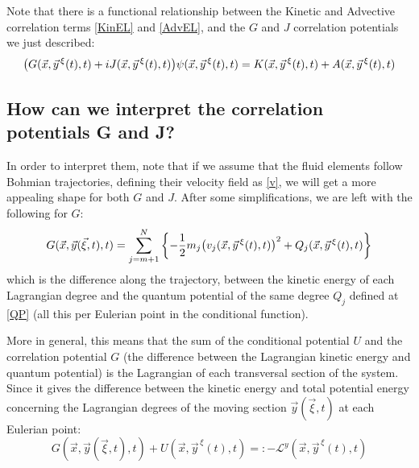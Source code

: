 \documentclass[11pt, a4paper]{article} %
\newcommand{\Lg}{\mathscr{L}}
\begin{document}
Note that there is a functional relationship between the Kinetic and Advective correlation terms \eqref{KinEL} and \eqref{AdvEL}, and the $G$ and $J$ correlation potentials we just described: 
\begin{equation}
\qty(G(\vec{x}, \vec{y}^{\, \xi}(t),t)+iJ(\vec{x}, \vec{y}^{\, \xi}(t),t))\psi(\vec{x}, \vec{y}^{\, \xi}(t),t)=K(\vec{x}, \vec{y}^{\, \xi}(t),t)+A(\vec{x}, \vec{y}^{\, \xi}(t),t)\vspace{-0.2cm}
\end{equation}
\subsection*{How can we interpret the correlation potentials G and J?}
In order to interpret them, note that if we assume that the fluid elements follow Bohmian trajectories, defining their velocity field as \eqref{v}, we will get a more appealing shape for both $G$ and $J$. After some simplifications, we are left with the following for $G$:
\begin{equation}\label{G.Bohm}
G(\vec{x},\vec{y}(\vec{\xi},t),t)=\sum_{j=m+1}^N\qty{-\frac{1}{2}m_j\qty(v_j(\vec{x},\vec{y}^{\, \xi}(t),t))^2+Q_j(\vec{x},\vec{y}^{\, \xi}(t),t)}
\end{equation}
which is the difference along the trajectory, between the kinetic energy of each Lagrangian degree and the quantum potential of the same degree $Q_j$ defined at \eqref{QP} (all this per Eulerian point in the conditional function).

More in general, this means that the sum of the conditional potential $U$ and the correlation potential $G$ (the difference between the Lagrangian kinetic energy and quantum potential) is the Lagrangian of each transversal section of the system. Since it gives the difference between the kinetic energy and total potential energy concerning the Lagrangian degrees of the moving section $\vec{y}(\vec{\xi},t)$ at each Eulerian point:
\begin{equation}
G(\vec{x},\vec{y}(\vec{\xi},t),t)+U(\vec{x},\vec{y}^{\, \xi}(t),t)=:-\Lg^y(\vec{x},\vec{y}^{\, \xi}(t),t)
\end{equation}
\end{document}
